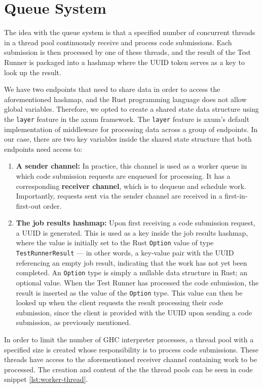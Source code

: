 \section{Queue System} \label{sec:queue-system}
The idea with the queue system is that a specified number of concurrent threads in a thread pool continuously receive and process code submissions.
Each submission is then processed by one of these threads, and the result of the Test Runner is packaged into a hashmap where the UUID token serves as a key to look up the result.

We have two endpoints that need to share data in order to access the aforementioned hashmap, and the Rust programming language does not allow global variables.
Therefore, we opted to create a shared state data structure using the \texttt{layer} feature in the axum framework.
The \texttt{layer} feature is axum's default implementation of middleware for processing data across a group of endpoints.
In our case, there are two key variables inside the shared state structure that both endpoints need access to:
\begin{enumerate}
    \item \textbf{A sender channel:} In practice, this channel is used as a worker queue in which code submission requests are enqueued for processing. It has a corresponding \textbf{receiver channel}, which is to dequeue and schedule work. Importantly, requests sent via the sender channel are received in a first-in-first-out order.
    \item \textbf{The job results hashmap:} Upon first receiving a code submission request, a UUID is generated. This is used as a key inside the job results hashmap, where the value is initially set to the Rust \texttt{Option} value of type \texttt{TestRunnerResult} --- in other words, a key-value pair with the UUID referencing an empty job result, indicating that the work has not yet been completed. An \texttt{Option} type is simply a nullable data structure in Rust; an optional value. When the Test Runner has processed the code submission, the result is inserted as the value of the \texttt{Option} type. This value can then be looked up when the client requests the result processing their code submission, since the client is provided with the UUID upon sending a code submission, as previously mentioned.
\end{enumerate}

In order to limit the number of GHC interpreter processes, a thread pool with a specified size is created whose responsibility is to process code submissions.
These threads have access to the aforementioned receiver channel containing work to be processed.
The creation and content of the the thread pools can be seen in code snippet \ref{lst:worker-thread}.

